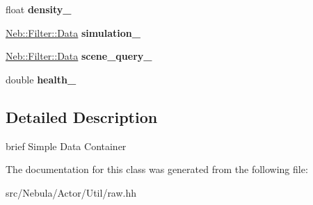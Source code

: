 \begin{DoxyCompactItemize}
\item 
\hypertarget{classNeb_1_1Actor_1_1Util_1_1Raw_ad5fd3d4b695b8992224c7c0da8bda44f}{float {\bfseries density\-\_\-}}\label{classNeb_1_1Actor_1_1Util_1_1Raw_ad5fd3d4b695b8992224c7c0da8bda44f}

\item 
\hypertarget{classNeb_1_1Actor_1_1Util_1_1Raw_a8a7fce3b6fcbef5900051ee4c030f232}{\hyperlink{classNeb_1_1Filter_1_1Data}{\-Neb\-::\-Filter\-::\-Data} {\bfseries simulation\-\_\-}}\label{classNeb_1_1Actor_1_1Util_1_1Raw_a8a7fce3b6fcbef5900051ee4c030f232}

\item 
\hypertarget{classNeb_1_1Actor_1_1Util_1_1Raw_a60a289fefdfb2a5587d6153def4725b5}{\hyperlink{classNeb_1_1Filter_1_1Data}{\-Neb\-::\-Filter\-::\-Data} {\bfseries scene\-\_\-query\-\_\-}}\label{classNeb_1_1Actor_1_1Util_1_1Raw_a60a289fefdfb2a5587d6153def4725b5}

\item 
\hypertarget{classNeb_1_1Actor_1_1Util_1_1Raw_a3de204fcfb553c73efd87c8bc04e3c43}{double {\bfseries health\-\_\-}}\label{classNeb_1_1Actor_1_1Util_1_1Raw_a3de204fcfb553c73efd87c8bc04e3c43}

\end{DoxyCompactItemize}


\subsection{\-Detailed \-Description}
brief \-Simple \-Data \-Container 

\-The documentation for this class was generated from the following file\-:\begin{DoxyCompactItemize}
\item 
src/\-Nebula/\-Actor/\-Util/raw.\-hh\end{DoxyCompactItemize}
